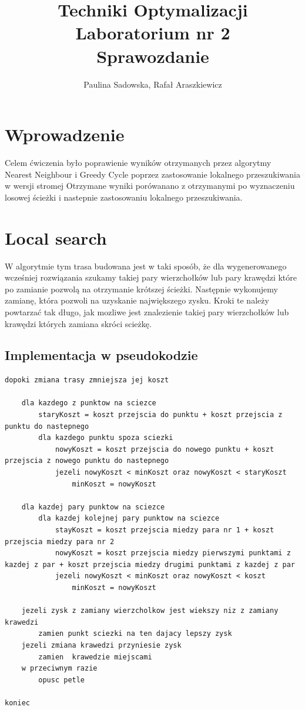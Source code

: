 \documentclass[a4paper 10pt]{article}
\title{\textbf{Techniki Optymalizacji} \\
Laboratorium nr 2 \\
Sprawozdanie}
\author{Paulina Sadowska, Rafał Araszkiewicz}
\begin{document}
\maketitle

\section{Wprowadzenie}
Celem ćwiczenia było poprawienie wyników otrzymanych przez algorytmy Nearest Neighbour i Greedy Cycle poprzez zastosowanie lokalnego przeszukiwania w wersji stromej Otrzymane wyniki porówanano z otrzymanymi po wyznaczeniu losowej ścieżki i nastepnie zastosowaniu lokalnego przeszukiwania.
\section{Local search}
\label{Local search}
W algorytmie tym trasa budowana jest w taki sposób, że dla wygenerowanego wcześniej rozwiązania szukamy takiej pary wierzchołków lub pary krawędzi które po zamianie pozwolą na otrzymanie krótszej ścieżki. Następnie wykonujemy zamianę, która pozwoli na uzyskanie największego zysku. Kroki te należy powtarzać tak długo, jak mozliwe jest znalezienie takiej pary wierzchołków lub krawędzi których zamiana skróci scieżkę.
\subsection{Implementacja w pseudokodzie}
\begin{lstlisting}[frame=single]
dopoki zmiana trasy zmniejsza jej koszt

	dla kazdego z punktow na sciezce
		staryKoszt = koszt przejscia do punktu + koszt przejscia z punktu do nastepnego
		dla kazdego punktu spoza sciezki
			nowyKoszt = koszt przejscia do nowego punktu + koszt przejscia z nowego punktu do nastepnego
			jezeli nowyKoszt < minKoszt oraz nowyKoszt < staryKoszt
				minKoszt = nowyKoszt 
				
	dla kazdej pary punktow na sciezce
		dla kazdej kolejnej pary punktow na sciezce
			stayKoszt = koszt przejscia miedzy para nr 1 + koszt przejscia miedzy para nr 2
			nowyKoszt = koszt przejscia miedzy pierwszymi punktami z kazdej z par + koszt przejscia miedzy drugimi punktami z kazdej z par
			jezeli nowyKoszt < minKoszt oraz nowyKoszt < koszt
				minKoszt = nowyKoszt			
	
	jezeli zysk z zamiany wierzcholkow jest wiekszy niz z zamiany krawedzi
		zamien punkt sciezki na ten dajacy lepszy zysk
	jezeli zmiana krawedzi przyniesie zysk	
		zamien  krawedzie miejscami
	w przeciwnym razie
		opusc petle
	
koniec

\end{lstlisting}
\label{Local search code}
\end{document}
